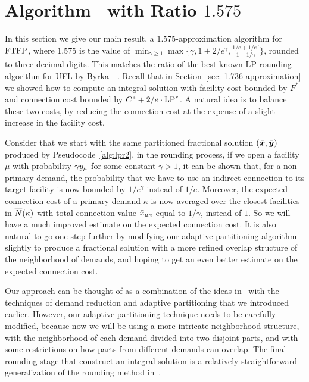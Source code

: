 

\section{Algorithm~{\EBGS} with Ratio $1.575$}\label{sec: 1.575-approximation}

In this section we give our main result, a $1.575$-approximation
algorithm for $\mbox{\rm FTFP}$, where $1.575$ is the value of $\min_{\gamma\geq
  1}\max\{\gamma, 1+2/e^\gamma, \frac{1/e+1/e^\gamma}{1-1/\gamma}\}$,
rounded to three decimal digits. This matches the ratio of the best
known LP-rounding algorithm for UFL by
Byrka~{\etal}~\cite{ByrkaGS10}. Recall that in Section~\ref{sec:
  1.736-approximation} we showed how to compute an integral solution
with facility cost bounded by $F^\ast$ and connection cost bounded by
$C^\ast + 2/e\cdot\mbox{\rm LP}^\ast$. A natural idea is to balance these two
costs, by reducing the connection cost at the expense of a slight
increase in the facility cost.

Consider that we start with the same partitioned fractional solution
$(\bar{\boldsymbol{x}}, \bar{\boldsymbol{y}})$ produced by Pseudocode~\ref{alg:lpr2}, in the
rounding process, if we open a facility $\mu$ with probability
$\gamma{\bar y}_{\mu}$ for some constant $\gamma > 1$, it can be shown
that, for a non-primary demand, the probability that we have to use an
indirect connection to its target facility is now bounded by
$1/e^\gamma$ instead of $1/e$. Moreover, the expected connection cost
of a primary demand $\kappa$ is now averaged over the closest
facilities in ${\overline{N}}(\kappa)$ with total connection value
${\bar x}_{\mu\kappa}$ equal to $1/\gamma$, instead of $1$. So we will
have a much improved estimate on the expected connection cost. It is
also natural to go one step further by modifying our adaptive
partitioning algorithm slightly to produce a fractional solution with
a more refined overlap structure of the neighborhood of demands, and
hoping to get an even better estimate on the expected connection cost.

Our approach can be thought of as a combination of the ideas
in~\cite{ByrkaGS10} with the techniques of demand reduction and
adaptive partitioning that we introduced earlier. However, our
adaptive partitioning technique needs to be carefully modified,
because now we will be using a more intricate neighborhood structure,
with the neighborhood of each demand divided into two disjoint parts,
and with some restrictions on how parts from different demands can
overlap. The final rounding stage that construct an integral solution
is a relatively straightforward generalization of the rounding method
in~\cite{ByrkaGS10}.

